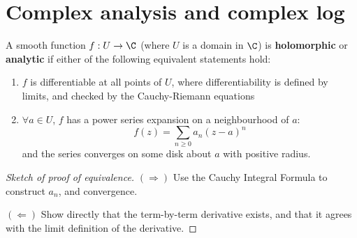 \documentclass{article}
\begin{document}
\maketitle

\section{Complex analysis and complex log}

\begin{defi}
    A smooth function $f: U \to \C$ (where $U$ is a domain in $\C$) is \textbf{holomorphic} or \textbf{analytic} if either of the following equivalent statements hold:
    \begin{enumerate}[(1)]
        \item $f$ is differentiable at all points of $U$, where differentiability is defined by limits, and checked by the Cauchy-Riemann equations
        \item $\forall a \in U$, $f$ has a power series expansion on a neighbourhood of $a$:
            \begin{equation*}
                f(z) = \sum_{n \geq 0} a_n (z - a)^n
            \end{equation*}
            and the series converges on some disk about $a$ with positive radius.
    \end{enumerate}
\end{defi}
\begin{proof}[Sketch of proof of equivalence]

    \leavevmode

    $(\Rightarrow)$ Use the Cauchy Integral Formula to construct $a_n$, and convergence.

    $(\Leftarrow)$ Show directly that the term-by-term derivative exists, and that it agrees with the limit definition of the derivative.
\end{proof}
\end{document}
